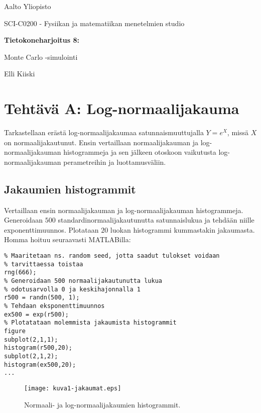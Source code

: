 \documentclass[a4paper,11pt]{article}
\begin{document}
{
\thispagestyle{empty}

{\large
Aalto Yliopisto
\par
SCI-C0200 - Fysiikan ja matematiikan menetelmien studio
}

\vspace{7cm}

{\huge \bf
Tietokoneharjoitus 8: 
\par
Monte Carlo -simulointi}

\vspace{2cm}

{\Large Elli Kiiski}

\clearpage

\tableofcontents

\clearpage

\section{Tehtävä A: Log-normaalijakauma}

Tarkastellaan erästä log-normaalijakaumaa satunnaismuuttujalla $Y=e^X$, missä $X$ on normaalijakautunut. Ensin vertaillaan normaalijakauman ja log-normaalijakauman histogrammeja ja sen jälkeen otoskoon vaikutusta log-normaalijakauman perametreihin ja luottamusväliin.

\subsection{Jakaumien histogrammit}

Vertaillaan ensin normaalijakauman ja log-normaalijakauman histogrammeja. Generoidaan $500$ standardinormaalijakautunutta satunnaislukua ja tehdään niille exponenttimuunnos. Plotataan $20$ luokan histogrammi kummastakin jakaumasta. Homma hoituu seuraavasti MATLABilla:

\begin{lstlisting}
% Maaritetaan ns. random seed, jotta saadut tulokset voidaan
% tarvittaessa toistaa
rng(666);
% Generoidaan 500 normaalijakautunutta lukua
% odotusarvolla 0 ja keskihajonnalla 1
r500 = randn(500, 1);
% Tehdaan eksponenttimuunnos
ex500 = exp(r500);
% Plotatataan molemmista jakaumista histogrammit
figure
subplot(2,1,1);
histogram(r500,20);
subplot(2,1,2);
histogram(ex500,20);
...
\end{lstlisting}

\begin{figure}
    \centering
    \texttt{[image: kuva1-jakaumat.eps]}
    \caption{Normaali- ja log-normaalijakaumien histogrammit.}
    \label{fig:hist}
\end{figure}

}
\end{document}
